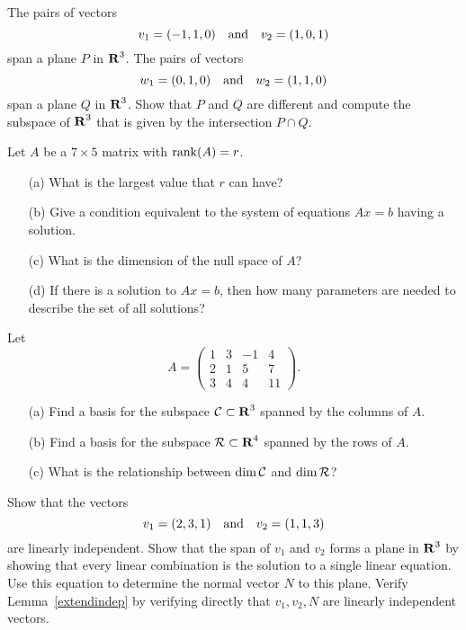 \documentclass{ximera}
\begin{document}
\begin{exercise} \label{c5.7.2}
The pairs of vectors
\[
     v_1=(-1,1,0) \quad\mbox{and}\quad v_2=(1,0,1)
\]
span a plane $P$ in $\mbox{$\bf{R}$}^3$.  The pairs of vectors
\[
        w_1=(0,1,0) \quad\mbox{and}\quad w_2=(1,1,0)
\]
span a plane $Q$ in $\mbox{$\bf{R}$}^3$.  Show that $P$ and $Q$
are different and compute the subspace of $\mbox{$\bf{R}$}^3$ that
is given by the intersection $P\cap Q$.
\end{exercise}

\begin{exercise} \label{c5.6.1}
Let $A$ be a $7\times 5$ matrix with ${\rm rank}(A)=r$.
\begin{itemize}
\item[(a)]	What is the largest value that $r$ can have?
\item[(b)]	Give a condition equivalent to the system of
	equations $Ax=b$ having a solution.
\item[(c)]	What is the dimension of the null space of $A$?
\item[(d)]	If there is a solution to $Ax=b$, then how many
parameters are needed to describe the set of all solutions?
\end{itemize}
\end{exercise}

\begin{exercise} \label{c5.6.2}
Let
\[
A=\left(\begin{array}{rrrr} 1 & 3 & -1 & 4\\ 2& 1 & 5 & 7\\ 3 & 4 & 4 & 11
\end{array}\right).
\]
\begin{itemize}
\item[(a)] Find a basis for the subspace ${\cal C}\subset\mbox{$\bf{R}$}^3$ spanned by the
columns of $A$.
\item[(b)] Find a basis for the subspace ${\cal R}\subset\mbox{$\bf{R}$}^4$ spanned by the
rows of $A$.
\item[(c)] What is the relationship between $\dim {\cal C}$ and
$\dim {\cal R}$?
\end{itemize}
\end{exercise}


\begin{exercise} \label{c5.6.3}
Show that the vectors
\[
v_1=(2,3,1) \quad\mbox{and}\quad v_2=(1,1,3)
\]
are linearly independent.   Show that the span of $v_1$ and $v_2$
forms a plane in $\mbox{$\bf{R}$}^3$ by showing that every linear combination
 is the solution to a single linear equation.  Use this equation
to determine the normal vector $N$ to this plane.  Verify
Lemma~\ref{extendindep} by verifying directly that $v_1,v_2,N$
are linearly independent vectors.
\end{exercise}
\end{document}
